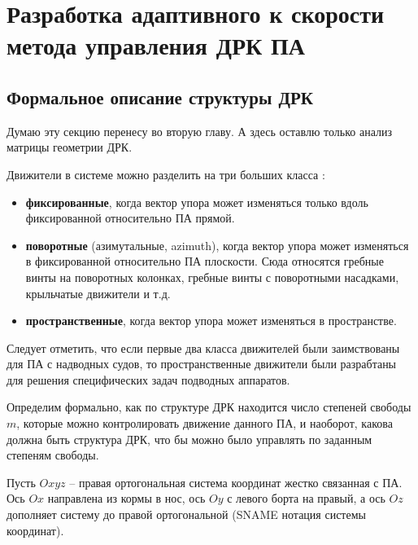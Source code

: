 \chapter{Разработка адаптивного к скорости метода управления ДРК ПА}\label{ch:Allocation}

\section{Формальное описание структуры ДРК}\label{sec:Allocation/System}
\begin{noteplan}
	Думаю эту секцию перенесу во вторую главу. А здесь оставлю только анализ матрицы геометрии ДРК.
\end{noteplan}

Движители в системе можно разделить на три больших класса \cite{армишев86}:
\begin{itemize}
    \item \textbf{фиксированные}, когда вектор упора может изменяться только вдоль фиксированной относительно ПА прямой.
    \item \textbf{поворотные} (азимутальные, azimuth), когда вектор упора может изменяться в фиксированной относительно ПА плоскости.
    Сюда относятся гребные винты на поворотных колонках, гребные винты с поворотными насадками, крыльчатые движители и т.д.
    \item \textbf{пространственные}, когда вектор упора может изменяться в пространстве.
\end{itemize}
Следует отметить, что если первые два класса движителей были заимствованы для ПА с надводных судов, то пространственные движители были разрабтаны для решения специфических задач подводных аппаратов.

Определим формально, как по структуре ДРК находится число степеней свободы $m$, которые можно контролировать движение данного ПА, и наоборот, какова должна быть структура ДРК, что бы можно было управлять по заданным степеням свободы.

Пусть $Oxyz$ -- правая ортогональная система координат жестко связанная с ПА. Ось $Ox$ направлена из кормы в нос, ось $Oy$ с левого борта на правый, а ось $Oz$ дополняет систему до правой ортогональной (SNAME нотация системы координат).

